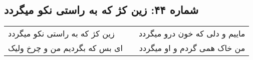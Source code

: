 \begin{center}
\section*{شماره ۴۴: زین کژ که به راستی نکو میگردد}
\label{sec:044}
\begin{longtable}{l p{0.5cm} r}
زین کژ که به راستی نکو میگردد
&&
ماییم و دلی که خون درو میگردد
\\
ای بس که بگردیم من و چرخ ولیک
&&
من خاک همی گردم و او میگردد
\\
\end{longtable}
\end{center}
